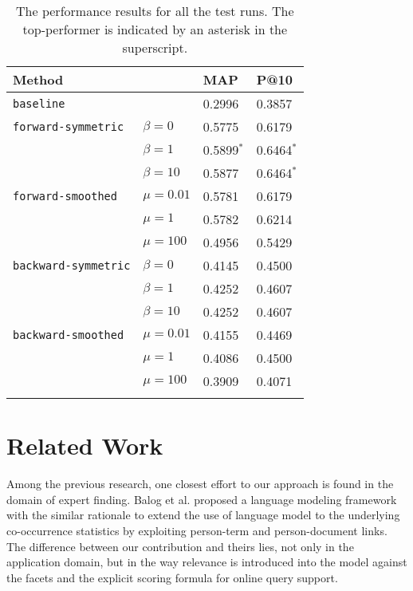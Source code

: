 \begin{table}[ht!]
  \centering
  \begin{tabular}{llll}
    Method & & MAP & P@10 \\
    \hline
    {\tt baseline} & & 0.2996 & 0.3857 \\
    {\tt forward-symmetric} & $\beta = 0$ & 0.5775 & 0.6179\\
    & $\beta = 1$ & 0.5899$^*$ & 0.6464$^*$ \\
    & $\beta = 10$ & 0.5877 & 0.6464$^*$ \\
    {\tt forward-smoothed} & $\mu = 0.01$ & 0.5781 & 0.6179 \\
    & $\mu = 1$ & 0.5782 & 0.6214 \\
    & $\mu = 100$ & 0.4956 & 0.5429 \\
    {\tt backward-symmetric} & $\beta = 0$ & 0.4145 & 0.4500\\
    & $\beta = 1$ & 0.4252 & 0.4607\\
    & $\beta = 10$ & 0.4252 & 0.4607\\
    {\tt backward-smoothed} & $\mu = 0.01$ & 0.4155 & 0.4469 \\
    & $\mu = 1$ & 0.4086 & 0.4500 \\
    & $\mu = 100$ & 0.3909 & 0.4071 \\
    \\
  \end{tabular}
  \caption{The performance results for all the test runs.  The top-performer is indicated by an asterisk in the superscript.}
  \label{t:performance}
\end{table}



\section{Related Work}



Among the previous research, one closest effort to our approach is found in the
domain of expert finding.  Balog et al. \cite{balog2009language} proposed a
language modeling framework with the similar rationale to extend the use of
language model to the underlying co-occurrence statistics by exploiting
person-term and person-document links.  The difference between our contribution
and theirs lies, not only in the application domain, but in the way relevance
is introduced into the model against the facets and the explicit scoring
formula for online query support.
 
